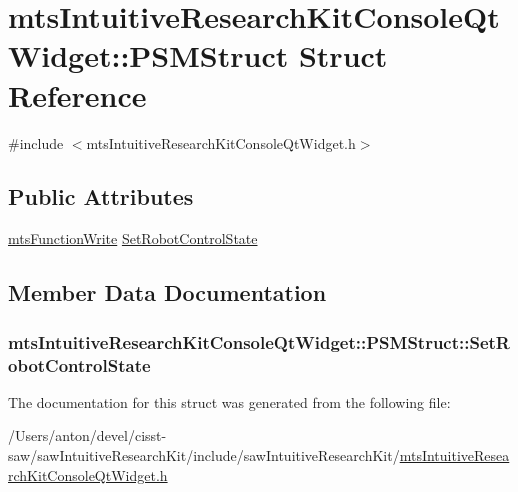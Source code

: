 \hypertarget{structmts_intuitive_research_kit_console_qt_widget_1_1_p_s_m_struct}{}\section{mts\+Intuitive\+Research\+Kit\+Console\+Qt\+Widget\+:\+:P\+S\+M\+Struct Struct Reference}
\label{structmts_intuitive_research_kit_console_qt_widget_1_1_p_s_m_struct}


{\ttfamily \#include $<$mts\+Intuitive\+Research\+Kit\+Console\+Qt\+Widget.\+h$>$}

\subsection*{Public Attributes}
\begin{DoxyCompactItemize}
\item 
\hyperlink{classmts_function_write}{mts\+Function\+Write} \hyperlink{structmts_intuitive_research_kit_console_qt_widget_1_1_p_s_m_struct_aa4b9c9d77414ddb02638cead3623cbad}{Set\+Robot\+Control\+State}
\end{DoxyCompactItemize}


\subsection{Member Data Documentation}
\hypertarget{structmts_intuitive_research_kit_console_qt_widget_1_1_p_s_m_struct_aa4b9c9d77414ddb02638cead3623cbad}{}
\subsubsection[{Set\+Robot\+Control\+State}]{ mts\+Intuitive\+Research\+Kit\+Console\+Qt\+Widget\+::\+P\+S\+M\+Struct\+::\+Set\+Robot\+Control\+State}\label{structmts_intuitive_research_kit_console_qt_widget_1_1_p_s_m_struct_aa4b9c9d77414ddb02638cead3623cbad}


The documentation for this struct was generated from the following file\+:\begin{DoxyCompactItemize}
\item 
/\+Users/anton/devel/cisst-\/saw/saw\+Intuitive\+Research\+Kit/include/saw\+Intuitive\+Research\+Kit/\hyperlink{mts_intuitive_research_kit_console_qt_widget_8h}{mts\+Intuitive\+Research\+Kit\+Console\+Qt\+Widget.\+h}\end{DoxyCompactItemize}
